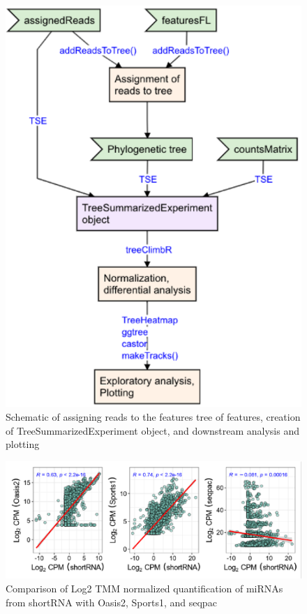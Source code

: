 \documentclass[12pt,twoside]{reedthesis}
\begin{document}
\begin{figure}[h]

{\centering \includegraphics{thesis_files/figure-latex/3f12-1} 

}

\caption{Schematic of assigning reads to the features tree of features, creation of TreeSummarizedExperiment object, and downstream analysis and plotting}\label{fig:3f12}
\end{figure}

\begin{figure}[h]

{\centering \includegraphics{thesis_files/figure-latex/3f13-1} 

}

\caption{Comparison of Log2 TMM normalized quantification of miRNAs from shortRNA with Oasis2, Sports1, and seqpac}\label{fig:3f13}
\end{figure}
\end{document}
